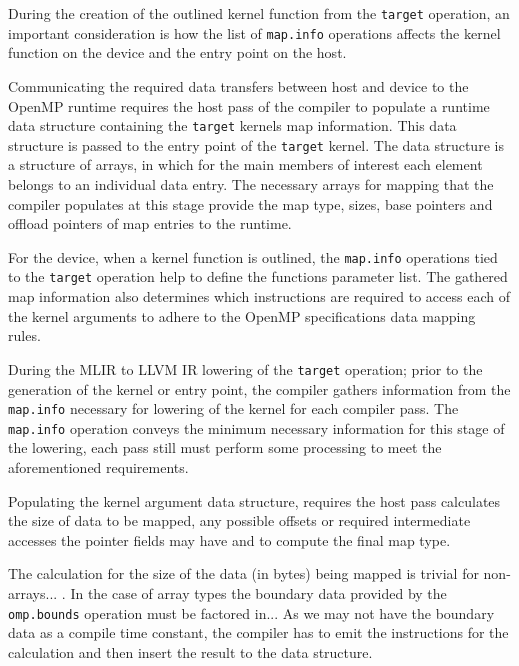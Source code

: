 \documentclass[acmtog,natbib=false]{acmart}
\newcommand{\code}[1]{\texttt{#1}\xspace}
\begin{document}
During the creation of the outlined kernel function from the \code{target} operation, an important consideration is how the list of \code{map.info} operations affects the kernel function on the device and the entry point on the host.

Communicating the required data transfers between host and device to the OpenMP runtime requires the host pass of the compiler to populate a runtime data structure containing the \code{target} kernels map information. 
This data structure is passed to the entry point of the \code{target} kernel. 
The data structure is a structure of arrays, in which for the main members of interest each element belongs to an individual data entry. 
The necessary arrays for mapping that the compiler populates at this stage provide the map type, sizes, base pointers and offload pointers of map entries to the runtime. 

For the device, when a kernel function is outlined, the \code{map.info} operations tied to the \code{target} operation help to define the functions parameter list. 
The gathered map information also determines which instructions are required to access each of the kernel arguments to adhere to the OpenMP specifications data mapping rules.

During the \ac{MLIR} to LLVM \ac{IR} lowering of the \code{target} operation; prior to the generation of the kernel or entry point, the compiler gathers information from the \code{map.info} necessary for lowering of the kernel for each compiler pass. 
The \code{map.info} operation conveys the minimum necessary information for this stage of the lowering, each pass still must perform some processing to meet the aforementioned requirements. 

Populating the kernel argument data structure, requires the host pass calculates the size of data to be mapped, any possible offsets or required intermediate accesses the pointer fields may have and to compute the final map type. 

The calculation for the size of the data (in bytes) being mapped is trivial for non-arrays... . 
In the case of array types the boundary data provided by the \code{omp.bounds} operation must be factored in...
As we may not have the boundary data as a compile time constant, the compiler has to emit the instructions for the calculation and then insert the result to the data structure.

\end{document}
